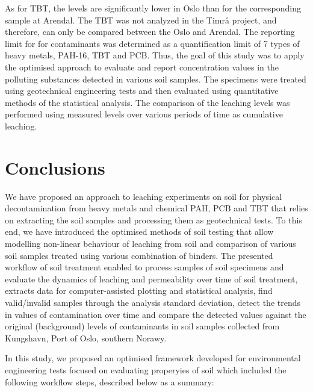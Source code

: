 \documentclass[algorithms,article,submit,pdftex,moreauthors]{Definitions/mdpi}
\begin{document}
As for TBT, the levels are significantly lower in Oslo than for the corresponding sample at Arendal. The TBT was not analyzed in the Timrå project, and therefore, can only be compared between the Oslo and Arendal. The reporting limit for for contaminants was determined as a quantification limit of 7 types of heavy metals, PAH-16, TBT and PCB. Thus, the goal of this study was to apply the optimised approach to evaluate and report concentration values in the polluting substances detected in various soil samples. The specimens were treated using geotechnical engineering tests and then evaluated using quantitative methods of the statistical analysis. The comparison of the leaching levels was performed using measured levels over various periods of time as cumulative leaching.

\section{Conclusions}

We have proposed an approach to leaching experiments on soil for physical decontamination from heavy metals and chemical PAH, PCB and TBT that relies on extracting the soil samples and processing them as geotechnical tests. To this end, we have introduced the optimised methods of soil testing that allow modelling non-linear behaviour of leaching from soil and comparison of various soil samples treated using various combination of binders. The presented workflow of soil treatment enabled to process samples of soil specimens and evaluate the dynamics of leaching and permeability over time of soil treatment, extracts data for computer-assisted plotting and statistical analysis, find valid/invalid samples through the analysis standard deviation, detect the trends in values of contamination over time and compare the detected values against the original (background) levels of contaminants in soil samples collected from Kungshavn, Port of Oslo, southern Norawy. 

In this study, we proposed an optimised framework developed for environmental engineering tests focused on evaluating properyies of soil which included the following workflow steps, described below as a summary: 
\end{document}
